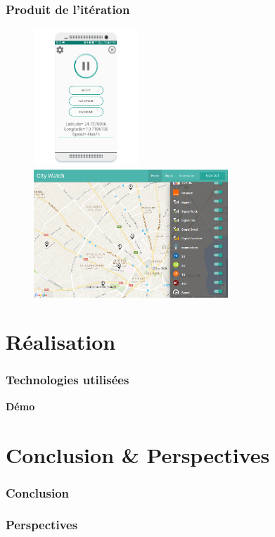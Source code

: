 \documentclass{beamer}
\begin{document}
\begin{frame}
    \frametitle{Produit de l'itération}
    \begin{figure}
        \includegraphics[width=0.35\textwidth]{./figures/sprint3-android-screenshot2}
        \includegraphics[width=0.65\textwidth]{./figures/sprint3-dashboard-screenshot1}
    \end{figure}
\end{frame}

\section{Réalisation}

\begin{frame}
\frametitle{Technologies utilisées}
\end{frame}
\begin{frame}
    \begin{center}
        \textbf{\Huge Démo}
    \end{center}
\end{frame}

\section{Conclusion \& Perspectives}
\begin{frame}
    \frametitle{Conclusion}
\end{frame}

\begin{frame}
    \frametitle{Perspectives}
\end{frame}
\end{document}
